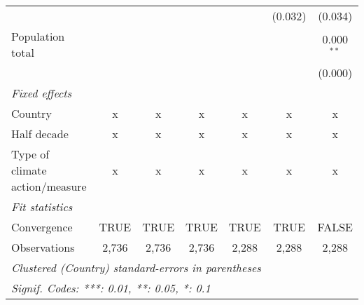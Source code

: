 \begin{tabular}{lcccccc}
                                                           &         &               &               &               & (0.032)       & (0.034)\\   
   Population total                                        &         &               &               &               &               & 0.000$^{**}$\\   
                                                           &         &               &               &               &               & (0.000)\\   
   \emph{Fixed effects}\\
   Country                                                 & x       & x             & x             & x             & x             & x\\  
   Half decade                                             & x       & x             & x             & x             & x             & x\\  
   Type of climate action/measure                          & x       & x             & x             & x             & x             & x\\  
   \midrule \emph{Fit statistics}\\
   Convergence                                             &TRUE     & TRUE          & TRUE          & TRUE          & TRUE          & FALSE\\  
   Observations                                            & 2,736   & 2,736         & 2,736         & 2,288         & 2,288         & 2,288\\  
   \midrule
   \multicolumn{7}{l}{\emph{Clustered (Country) standard-errors in parentheses}}\\
   \multicolumn{7}{l}{\emph{Signif. Codes: ***: 0.01, **: 0.05, *: 0.1}}\\
\end{tabular}
\par\endgroup


